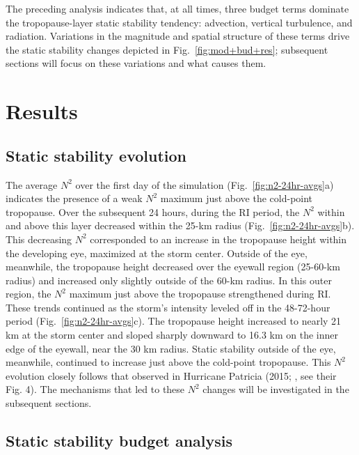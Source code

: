 The preceding analysis indicates that, at all times, three budget terms dominate the tropopause-layer static stability tendency: advection, vertical turbulence, and radiation.
Variations in the magnitude and spatial structure of these terms drive the static stability changes depicted in Fig.~\ref{fig:mod+bud+res}; subsequent sections will focus on these variations and what causes them.

\section{Results}
 \subsection{Static stability evolution}

The average $N^2$ over the first day of the simulation (Fig.~\ref{fig:n2-24hr-avgs}a) indicates the presence of a weak $N^2$ maximum just above the cold-point tropopause.
Over the subsequent 24 hours, during the RI period, the $N^2$ within and above this layer decreased within the 25-km radius (Fig.~\ref{fig:n2-24hr-avgs}b).
This decreasing $N^2$ corresponded to an increase in the tropopause height within the developing eye, maximized at the storm center.
Outside of the eye, meanwhile, the tropopause height decreased over the eyewall region (25-60-km radius) and increased only slightly outside of the 60-km radius.
In this outer region, the $N^2$ maximum just above the tropopause strengthened during RI.
These trends continued as the storm's intensity leveled off in the 48-72-hour period (Fig.~\ref{fig:n2-24hr-avgs}c).
The tropopause height increased to nearly 21 km at the storm center and sloped sharply downward to 16.3 km on the inner edge of the eyewall, near the 30 km radius.
Static stability outside of the eye, meanwhile, continued to increase just above the cold-point tropopause.
This $N^2$ evolution closely follows that observed in Hurricane Patricia (2015; \citeauthor{DuranMolinari2018} \citeyear{DuranMolinari2018}, see their Fig. 4).
The mechanisms that led to these $N^2$ changes will be investigated in the subsequent sections.

 \subsection{Static stability budget analysis}

